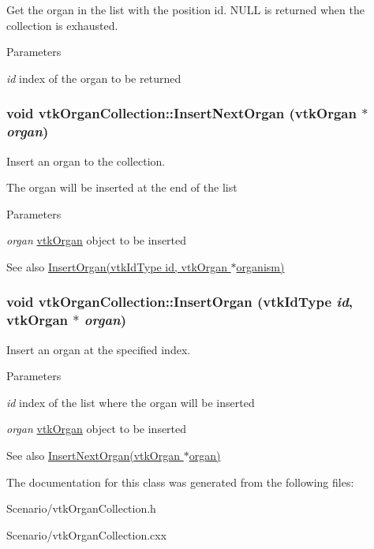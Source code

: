 Get the organ in the list with the position id. NULL is returned when the collection is exhausted. 
\begin{DoxyParams}{Parameters}
\item[{\em id}]index of the organ to be returned \end{DoxyParams}
\hypertarget{classvtkOrganCollection_abf0d197e67a3d97b38b35a149585a361}{
\subsubsection[{InsertNextOrgan}]{\setlength{\rightskip}{0pt plus 5cm}void vtkOrganCollection::InsertNextOrgan ({\bf vtkOrgan} $\ast$ {\em organ})}}
\label{classvtkOrganCollection_abf0d197e67a3d97b38b35a149585a361}


Insert an organ to the collection. 

The organ will be inserted at the end of the list 
\begin{DoxyParams}{Parameters}
\item[{\em organ}]\hyperlink{classvtkOrgan}{vtkOrgan} object to be inserted \end{DoxyParams}
\begin{DoxySeeAlso}{See also}
\hyperlink{classvtkOrganCollection_ab477eb49fdffaa1d077634f9b547fa35}{InsertOrgan(vtkIdType id, vtkOrgan $\ast$organism)} 
\end{DoxySeeAlso}
\hypertarget{classvtkOrganCollection_ab477eb49fdffaa1d077634f9b547fa35}{
\subsubsection[{InsertOrgan}]{\setlength{\rightskip}{0pt plus 5cm}void vtkOrganCollection::InsertOrgan (vtkIdType {\em id}, \/  {\bf vtkOrgan} $\ast$ {\em organ})}}
\label{classvtkOrganCollection_ab477eb49fdffaa1d077634f9b547fa35}


Insert an organ at the specified index. 


\begin{DoxyParams}{Parameters}
\item[{\em id}]index of the list where the organ will be inserted \item[{\em organ}]\hyperlink{classvtkOrgan}{vtkOrgan} object to be inserted \end{DoxyParams}
\begin{DoxySeeAlso}{See also}
\hyperlink{classvtkOrganCollection_abf0d197e67a3d97b38b35a149585a361}{InsertNextOrgan(vtkOrgan $\ast$organ)} 
\end{DoxySeeAlso}


The documentation for this class was generated from the following files:\begin{DoxyCompactItemize}
\item 
Scenario/vtkOrganCollection.h\item 
Scenario/vtkOrganCollection.cxx\end{DoxyCompactItemize}
